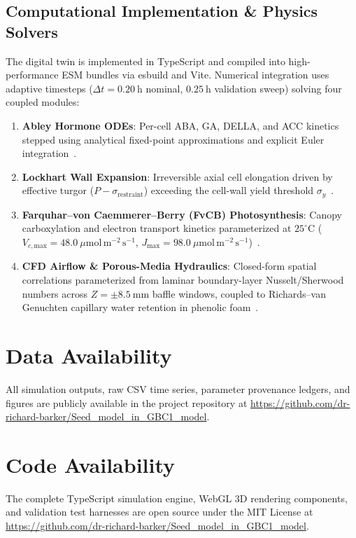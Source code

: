 \documentclass[10pt,twocolumn,twoside]{article}
\begin{document}
\subsection*{Computational Implementation \& Physics Solvers}
The digital twin is implemented in TypeScript and compiled into high-performance ESM bundles via esbuild and Vite. Numerical integration uses adaptive timesteps ($\Delta t = 0.20\ \mathrm{h}$ nominal, $0.25\ \mathrm{h}$ validation sweep) solving four coupled modules:
\begin{enumerate}
    \item \textbf{Abley Hormone ODEs}: Per-cell ABA, GA, DELLA, and ACC kinetics stepped using analytical fixed-point approximations and explicit Euler integration~\cite{abley2021,topham2017}.
    \item \textbf{Lockhart Wall Expansion}: Irreversible axial cell elongation driven by effective turgor ($P - \sigma_{\mathrm{restraint}}$) exceeding the cell-wall yield threshold $\sigma_y$~\cite{lockhart1965,bassel2014}.
    \item \textbf{Farquhar--von Caemmerer--Berry (FvCB) Photosynthesis}: Canopy carboxylation and electron transport kinetics parameterized at $25^\circ\mathrm{C}$ ($V_{c,\mathrm{max}} = 48.0\ \mu\mathrm{mol\,m^{-2}\,s^{-1}}$, $J_{\mathrm{max}} = 98.0\ \mu\mathrm{mol\,m^{-2}\,s^{-1}}$)~\cite{farquhar1980biochemical}.
    \item \textbf{CFD Airflow \& Porous-Media Hydraulics}: Closed-form spatial correlations parameterized from laminar boundary-layer Nusselt/Sherwood numbers across $Z = \pm 8.5\ \mathrm{mm}$ baffle windows, coupled to Richards--van Genuchten capillary water retention in phenolic foam~\cite{vangenuchten1980}.
\end{enumerate}

\section*{Data Availability}
All simulation outputs, raw CSV time series, parameter provenance ledgers, and figures are publicly available in the project repository at \url{https://github.com/dr-richard-barker/Seed_model_in_GBC1_model}.

\section*{Code Availability}
The complete TypeScript simulation engine, WebGL 3D rendering components, and validation test harnesses are open source under the MIT License at \url{https://github.com/dr-richard-barker/Seed_model_in_GBC1_model}.
\end{document}
